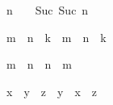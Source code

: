 \begin{isabellebody}
\begin{isamarkuptext}
\begin{isabelle}%
n\ {\isacharplus}\ {\isacharhash}{}\ {\isacharequal}\ Suc\ {\isacharparenleft}Suc\ n{\isacharparenright}%
\end{isabelle}

\begin{isabelle}%
m\ {\isacharplus}\ n\ {\isacharplus}\ k\ {\isacharequal}\ m\ {\isacharplus}\ {\isacharparenleft}n\ {\isacharplus}\ k{\isacharparenright}%
\end{isabelle}

\begin{isabelle}%
m\ {\isacharplus}\ n\ {\isacharequal}\ n\ {\isacharplus}\ m%
\end{isabelle}

\begin{isabelle}%
x\ {\isacharplus}\ {\isacharparenleft}y\ {\isacharplus}\ z{\isacharparenright}\ {\isacharequal}\ y\ {\isacharplus}\ {\isacharparenleft}x\ {\isacharplus}\ z{\isacharparenright}%
\end{isabelle}


\end{isamarkuptext}
\end{isabellebody}
